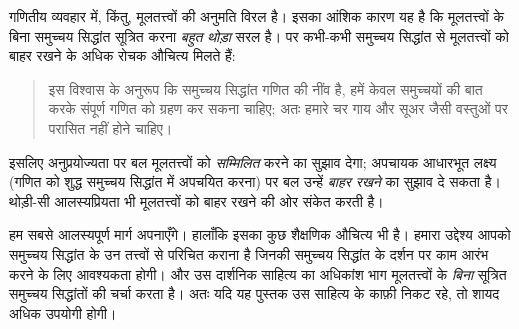 \documentclass[../../../include/open-logic-section]{subfiles}
\begin{document}
गणितीय व्यवहार में, किंतु, मूलतत्त्वों की अनुमति विरल है। इसका आंशिक कारण
यह है कि मूलतत्त्वों के बिना समुच्चय सिद्धांत सूत्रित करना \emph{बहुत थोड़ा}
सरल है। पर कभी-कभी समुच्चय सिद्धांत से मूलतत्त्वों को बाहर रखने के अधिक
रोचक औचित्य मिलते हैं:
\begin{quote}
	इस विश्वास के अनुरूप कि समुच्चय सिद्धांत गणित की नींव है, हमें केवल
	समुच्चयों की बात करके संपूर्ण गणित को ग्रहण कर सकना चाहिए; अतः हमारे चर
	गाय और सूअर जैसी वस्तुओं पर परासित नहीं होने चाहिए।
	\citep[p.~8]{Kunen1980}
\end{quote}
इसलिए अनुप्रयोज्यता पर बल मूलतत्त्वों को \emph{सम्मिलित} करने का सुझाव
देगा; अपचायक आधारभूत लक्ष्य (गणित को शुद्ध समुच्चय सिद्धांत में अपचयित करना)
पर बल उन्हें \emph{बाहर रखने} का सुझाव दे सकता है। थोड़ी-सी आलस्यप्रियता भी
मूलतत्त्वों को बाहर रखने की ओर संकेत करती है।

हम सबसे आलस्यपूर्ण मार्ग अपनाएँगे। हालाँकि इसका कुछ शैक्षणिक औचित्य भी है।
हमारा उद्देश्य आपको समुच्चय सिद्धांत के उन तत्त्वों से परिचित कराना है जिनकी
समुच्चय सिद्धांत के दर्शन पर काम आरंभ करने के लिए आवश्यकता होगी। और उस
दार्शनिक साहित्य का अधिकांश भाग मूलतत्त्वों के \emph{बिना} सूत्रित समुच्चय
सिद्धांतों की चर्चा करता है। अतः यदि यह पुस्तक उस साहित्य के काफ़ी निकट रहे,
तो शायद अधिक उपयोगी होगी।
\end{document}
